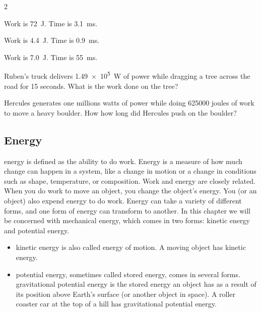 \documentclass{article}
\numberwithin{equation}{section}
\numberwithin{figure}{section}
\begin{document}
\begin{multicols}{2}
\begin{exercise} \label{AORjkH}
    Work is \SI{72}{J}. Time is \SI{3.1}{ms}.
\end{exercise}

\begin{exercise} \label{iKHe2E}
    Work is \SI{4.4}{J}. Time is \SI{0.9}{ms}.
\end{exercise}

\begin{exercise} \label{bPWZDf}
    Work is \SI{7.0}{J}. Time is \SI{55}{ms}.
\end{exercise}

\cyanhrule

\begin{exercise} \label{RvNudw}
    Ruben's truck delivers \SI{1.49e5}{W} of power while dragging a tree across the road for 15 seconds. What is the work done on the tree?
\end{exercise}

\begin{exercise} \label{b9UIEt}
    Hercules generates one millions watts of power while doing \SI{625000}{} joules of work to move a heavy boulder. How how long did Hercules push on the boulder?
\end{exercise}
\cyanhrule
\end{multicols}

\clearpage
\subsection{Energy} \label{iHOPFl}

\Gls{energy} is defined as the ability to do work. Energy is a measure of how much change can happen in a system, like a change in motion or a change in conditions such as shape, temperature, or composition. Work and energy are closely related. When you do work to move an object, you change the object's energy. You (or an object) also expend energy to do work. Energy can take a variety of different forms, and one form of energy can transform to another. In this chapter we will be concerned with \gls{mechanical energy}, which comes in two forms: kinetic energy and potential energy.

\begin{itemize}
\setlength\itemsep{-0.8ex}
    \item \Gls{kinetic energy} is also called energy of motion. A moving object has kinetic energy.
    \item \Gls{potential energy}, sometimes called stored energy, comes in several forms. \Gls{gravitational potential energy} is the stored energy an object has as a result of its position above Earth's surface (or another object in space). A roller coaster car at the top of a hill has gravitational potential energy.
\end{itemize}
\end{document}
